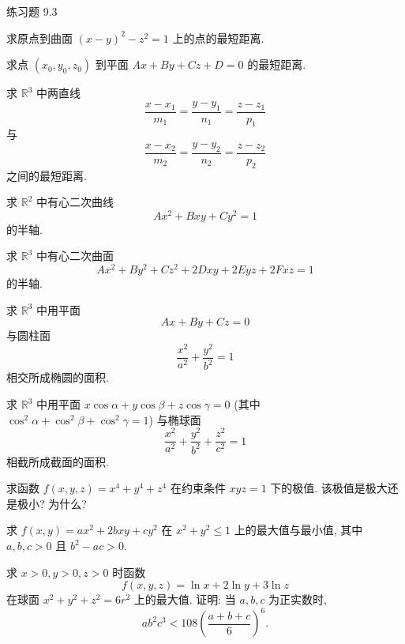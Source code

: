 \begin{exblock}{练习题 9.3}
  \item 求原点到曲面 $(x - y)^{2} - z^{2} = 1$ 上的点的最短距离.

  \item 求点 $(x_{0}, y_{0}, z_{0})$ 到平面 $Ax + By + Cz + D = 0$ 的最短距离.

  \item 求 $\mathbb{R}^{3}$ 中两直线
  \[
    \frac{x - x_{1}}{m_{1}} = \frac{y - y_{1}}{n_{1}} = \frac{z - z_{1}}{p_{1}}
  \]
  与
  \[
    \frac{x - x_{2}}{m_{2}} = \frac{y - y_{2}}{n_{2}} = \frac{z - z_{2}}{p_{2}}
  \]
  之间的最短距离.

  \item 求 $\mathbb{R}^{2}$ 中有心二次曲线
  \[
    Ax^{2} + Bxy + Cy^{2} = 1
  \]
  的半轴.

  \item 求 $\mathbb{R}^{3}$ 中有心二次曲面
  \[
    Ax^{2} + By^{2} + Cz^{2} + 2Dxy + 2Eyz + 2Fxz = 1
  \]
  的半轴.

  \item 求 $\mathbb{R}^{3}$ 中用平面
  \[
    Ax + By + Cz = 0
  \]
  与圆柱面
  \[
    \frac{x^{2}}{a^{2}} + \frac{y^{2}}{b^{2}} = 1
  \]
  相交所成椭圆的面积.

  \item 求 $\mathbb{R}^{3}$ 中用平面 $x\cos\alpha + y\cos\beta + z\cos\gamma = 0$ (其中 $\cos^{2}\alpha + \cos^{2}\beta + \cos^{2}\gamma = 1$) 与椭球面
  \[
    \frac{x^{2}}{a^{2}} + \frac{y^{2}}{b^{2}} + \frac{z^{2}}{c^{2}} = 1
  \]
  相截所成截面的面积.

  \item 求函数 $f(x, y, z) = x^{4} + y^{4} + z^{4}$ 在约束条件 $xyz = 1$ 下的极值. 该极值是极大还是极小? 为什么?

  \item 求 $f(x, y) = ax^{2} + 2bxy + cy^{2}$ 在 $x^{2} + y^{2} \leqslant 1$ 上的最大值与最小值, 其中 $a, b, c > 0$ 且 $b^{2} - ac > 0$.

  \item 求 $x > 0, y > 0, z > 0$ 时函数
  \[
    f(x, y, z) = \ln x + 2\ln y + 3\ln z
  \]
  在球面 $x^{2} + y^{2} + z^{2} = 6r^{2}$ 上的最大值. 证明: 当 $a, b, c$ 为正实数时,
  \[
    ab^{2}c^{3} < 108\left(\frac{a + b + c}{6}\right)^{6}.
  \]
\end{exblock}
